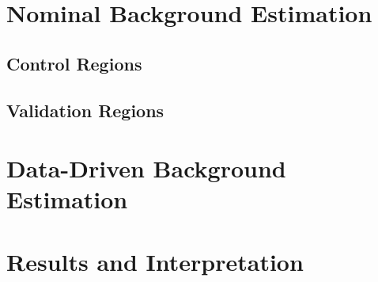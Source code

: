 

	\section{Nominal Background Estimation}
	\label{sec:bkgest}

		\subsection{Control Regions}

		\subsection{Validation Regions}


	\section{Data-Driven Background Estimation}
	\label{sec:ddbkgest}


	\section{Results and Interpretation}
	\label{sec:results}
